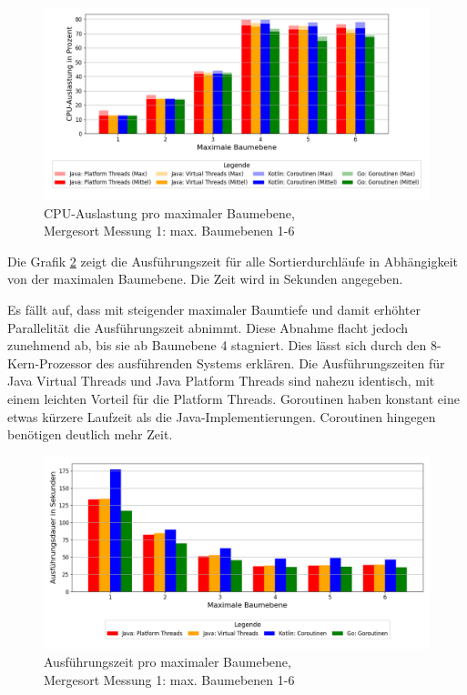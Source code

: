 \documentclass[fontsize=12pt,paper=a4,twoside=semi,parskip=half-,headsepline,headinclude]{scrreprt}
\begin{document}
\begin{figure}[H]
	\centering
	\includegraphics[scale=0.5]{figures/mergesort/Maximalebauebenen1-6/cpu_usage_bar_plot.png}
	\caption{CPU-Auslastung pro maximaler Baumebene,\\ Mergesort Messung 1: max. Baumebenen 1-6}
	\label{fig:ms1-6CPU}
\end{figure}

Die Grafik \ref{fig:ms1-6Zeit} zeigt die Ausführungszeit für alle Sortierdurchläufe in Abhängigkeit von der maximalen Baumebene. Die Zeit wird in Sekunden angegeben.

Es fällt auf, dass mit steigender maximaler Baumtiefe und damit erhöhter Parallelität die Ausführungszeit abnimmt. Diese Abnahme flacht jedoch zunehmend ab, bis sie ab Baumebene 4 stagniert. Dies lässt sich durch den 8-Kern-Prozessor des ausführenden Systems erklären. Die Ausführungszeiten für Java Virtual Threads und Java Platform Threads sind nahezu identisch, mit einem leichten Vorteil für die Platform Threads. Goroutinen haben konstant eine etwas kürzere Laufzeit als die Java-Implementierungen. Coroutinen hingegen benötigen deutlich mehr Zeit.

\begin{figure}[H]
	\centering
	\includegraphics[scale=0.5]{figures/mergesort/Maximalebauebenen1-6/execution_time_plot.png}
	\caption{Ausführungszeit pro maximaler Baumebene,\\ Mergesort Messung 1: max. Baumebenen 1-6}
	\label{fig:ms1-6Zeit}
\end{figure}
\end{document}
